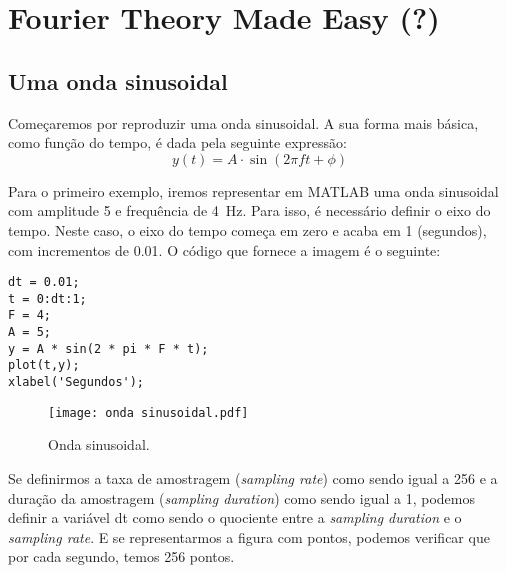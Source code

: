 \chapter{Fourier Theory Made Easy (?)}
\section{Uma onda sinusoidal}

Começaremos por reproduzir uma onda sinusoidal. A sua forma mais básica, como função do tempo, é dada pela seguinte expressão:
\begin{equation}
    y(t) = A\cdot \sin \left(2\pi f t + \phi\right)
\end{equation}

Para o primeiro exemplo, iremos representar em MATLAB uma onda sinusoidal com amplitude 5 e frequência de 4~Hz. Para isso, é necessário definir o eixo do tempo. Neste caso, o eixo do tempo começa em zero e acaba em 1 (segundos), com incrementos de 0.01. O código que fornece a imagem é o seguinte:

\begin{lstlisting}[style=Matlab-editor, basicstyle=\small, caption={Slide 2.}, label={lst: onda sinusoidal}]
dt = 0.01;
t = 0:dt:1;
F = 4;
A = 5;
y = A * sin(2 * pi * F * t);
plot(t,y);
xlabel('Segundos');
\end{lstlisting}

\begin{figure}[!ht]
\centering
\texttt{[image: onda sinusoidal.pdf]}
\caption{Onda sinusoidal.}
\label{fig:onda sinusoidal}
\end{figure}

\newpage

Se definirmos a taxa de amostragem (\emph{sampling rate}) como sendo igual a 256 e a duração da amostragem (\emph{sampling duration}) como sendo igual a 1, podemos definir a variável dt como sendo o quociente entre a \emph{sampling duration} e o \emph{sampling rate}. E se representarmos a figura com pontos, podemos verificar que por cada segundo, temos 256 pontos.

